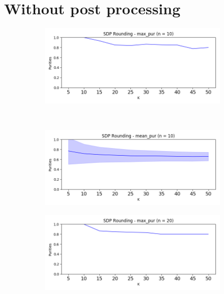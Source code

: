 \documentclass{article}
\begin{document}
\section{Without post processing}
    \begin{figure}[h!]
        \centering
        \begin{subfigure}[t]{0.5\textwidth}
            \centering
            \includegraphics[width=\textwidth]{max_pur_10n_false}
            \caption{}
        \end{subfigure}%
        ~ 
        \begin{subfigure}[t]{0.5\textwidth}
            \centering
            \includegraphics[width=\textwidth]{mean_pur_10n_false}
            \caption{}
        \end{subfigure}
        \begin{subfigure}[t]{0.5\textwidth}
            \centering
            \includegraphics[width=\textwidth]{max_pur_20n_false}

\end{subfigure}
\end{figure}
\end{document}
